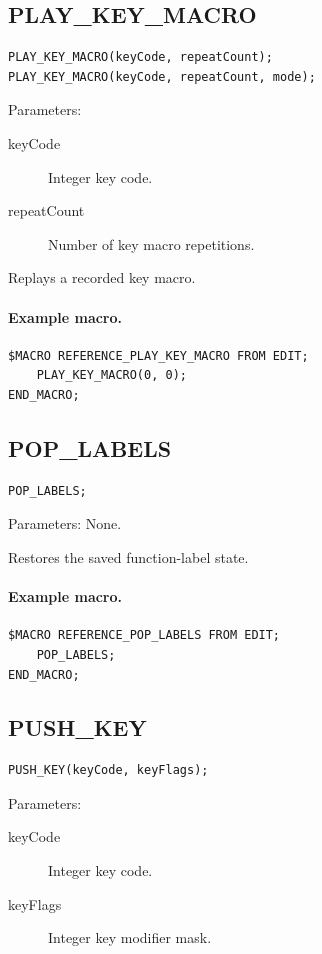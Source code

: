\documentclass[a4paper,10pt,twoside,openany]{book}
\begin{document}
\subsection*{PLAY\_KEY\_MACRO}
\begin{verbatim}
PLAY_KEY_MACRO(keyCode, repeatCount);
PLAY_KEY_MACRO(keyCode, repeatCount, mode);
\end{verbatim}
Parameters:
\begin{description}
\item[keyCode] Integer key code.
\item[repeatCount] Number of key macro repetitions.
\end{description}

Replays a recorded key macro.

\paragraph{Example macro.}
\begin{verbatim}
$MACRO REFERENCE_PLAY_KEY_MACRO FROM EDIT;
    PLAY_KEY_MACRO(0, 0);
END_MACRO;
\end{verbatim}

\label{prim:procedure-pop-labels}
\subsection*{POP\_LABELS}
\begin{verbatim}
POP_LABELS;
\end{verbatim}
Parameters: None.

Restores the saved function-label state.

\paragraph{Example macro.}
\begin{verbatim}
$MACRO REFERENCE_POP_LABELS FROM EDIT;
    POP_LABELS;
END_MACRO;
\end{verbatim}

\label{prim:procedure-push-key}
\subsection*{PUSH\_KEY}
\begin{verbatim}
PUSH_KEY(keyCode, keyFlags);
\end{verbatim}
Parameters:
\begin{description}
\item[keyCode] Integer key code.
\item[keyFlags] Integer key modifier mask.
\end{description}
\end{document}
